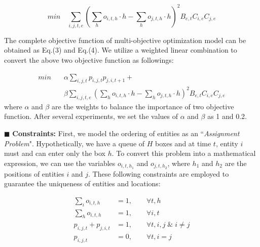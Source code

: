 \documentclass[review,journal]{vgtc}         %
\begin{document}
\begin{equation}
min \quad \sum_{i,j,t,e}(\sum_{h}o_{i,t,h}\cdot h-\sum_{h}o_{j,t,h}\cdot h)^2B_{e,t}C_{i,e}C_{j,e}
\end{equation}

The complete objective function of multi-objective optimization model can be obtained as Eq.(3) and Eq.(4). We utilize a weighted linear combination to convert the above two objective function as followings:

\vspace{-1em}
\begin{equation}
\begin{split}
min \quad &\alpha\sum_{i,j,t}p_{i,j,t}p_{j,i,t+1} + \\
&\beta\sum_{i,j,t,e}(\sum_{h}o_{i,t,h}\cdot h-\sum_{h}o_{j,t,h}\cdot h)^2B_{e,t}C_{i,e}C_{j,e}
\end{split}
\end{equation}
where $\alpha$ and $\beta$ are the weights to balance the importance of two objective function. After several experiments, we set the values of $\alpha$ and $\beta$ as 1 and 0.2.

$\blacksquare$ \textbf{Constraints:} First, we model the ordering of entities as an ``\textit{Assignment Problem}". Hypothetically, we have a queue of $H$ boxes and at time $t$, entity $i$ must and can enter only the box $h$. To convert this problem into a mathematical expression, we can use the variables $o_{i,t,h_1}$ and $o_{j,t,h_2}$, where $h_1$ and $h_2$ are the positions of entities $i$ and $j$. These following constraints are employed to guarantee the uniqueness of entities and locations:

\vspace{-1em}
\begin{subequations}
	\begin{align}
	\sum_io_{i,t,h}&=1, \quad\quad \forall t,h \\
	\sum_ho_{i,t,h}&=1, \quad\quad \forall i,t \\
	p_{i,j,t}+p_{j,i,t}&=1, \quad\quad \forall t,i,j\;\&\;i \neq j\\
	p_{i,j,t}&=0, \quad\quad \forall t,i=j
	\end{align}
\end{subequations}
\end{document}
